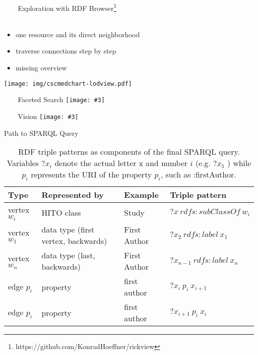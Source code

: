 \documentclass[aspectratio=1610,12pt]{beamer}
\newcommand{\imageslide}[4][]
{
\newgeometry{margin=0cm,top=1em}
\begin{frame}[plain]{~~~~#2}
\vspace{0.2em}
\centering\texttt{[image: \#3]}
\\#1
\note{#4}
\end{frame}
\restoregeometry
}
\newcommand{\imageslidebare}[1]
{
\newgeometry{margin=0cm,top=1em}
\begin{frame}[plain]
\centering\texttt{[image: \#1]}
\end{frame}
\restoregeometry
}
\begin{document}
{
\begin{frame}[plain]{~~~~Exploration with RDF Browser\footnote{https://github.com/KonradHoeffner/rickview}}
~\\
~\\
\begin{itemize}
\setlength\itemsep{1em}
\item one resource and its direct neighborhood
\item traverse connections step by step
\item missing overview
\end{itemize}
\vspace{-9em}
\hspace{20em}
\centering\texttt{[image: img/cscmedchart-lodview.pdf]}
\end{frame}
\restoregeometry
}


\imageslide{Faceted Search}{img/hitofaceted.png}{}{}


\imageslide{Vision}{img/idea.pdf}{}{}

\begin{frame}{Path to SPARQL Query}
\begin{table}[ht]
\centering
\begin{tabular}{@{}llll@{}}
\toprule
Type & Represented by & Example & Triple pattern \\ \midrule
vertex $w_i$ & HITO class & Study & $?x \ rdfs:subClassOf \ w_i$ \\
vertex $w_1$ & data type (first vertex, backwards) & First Author & $?x_2 \ rdfs:label \ x_1$ \\
vertex $w_n$ & data type (last, backwards) & First Author & $?x_{n-1} \ rdfs:label \ x_n$ \\
edge $p_i$ & property & first author & $?x_i \ p_i \ x_{i+1}$ \\
edge $p_i$ & property & first author & $?x_{i+1} \ p_i \ x_i$ \\ \bottomrule
\end{tabular}
\caption{RDF triple patterns as components of the final SPARQL query. Variables $?x_i$ denote the actual letter x and number $i$ (e.g. $?x_5$ ) while $p_i$ represents the URI of the property $p_i$, such as :firstAuthor.}
\end{table}
\end{frame}
\end{document}
